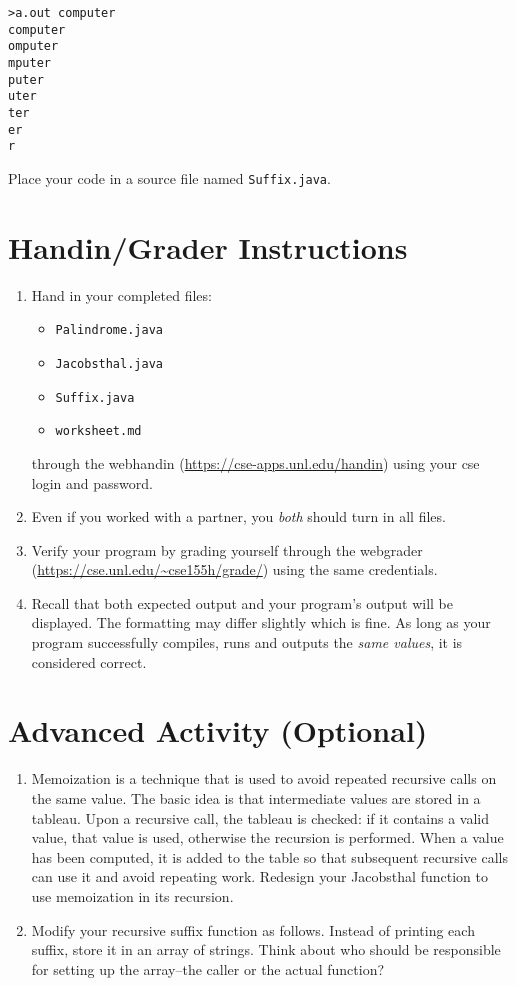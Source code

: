 \documentclass[12pt]{scrartcl}
\begin{document}
\begin{verbatim}
>a.out computer
computer
omputer
mputer
puter
uter
ter
er
r
\end{verbatim}

Place your code in a source file named 
\texttt{Suffix.java}.

\section{Handin/Grader Instructions}

\begin{enumerate}
  \item Hand in your completed files:
    \begin{itemize}
    \item \texttt{Palindrome.java}
    \item \texttt{Jacobsthal.java}
    \item \texttt{Suffix.java}
    \item \texttt{worksheet.md}
  \end{itemize}
  through the webhandin (\url{https://cse-apps.unl.edu/handin}) 
  using your cse login and password.  
  \item Even if you worked with a partner, you \emph{both} should
  turn in all files.
  \item Verify your program by grading yourself through the
  webgrader (\url{https://cse.unl.edu/~cse155h/grade/}) using the
  same credentials.
  \item Recall that both expected output and your program's output
  will be displayed.  The formatting may differ slightly which is fine.
  As long as your program successfully compiles, runs and outputs 
  the \emph{same values}, it is considered correct.
\end{enumerate}


\section{Advanced Activity (Optional)}

\begin{enumerate}
  \item Memoization is a technique that is used to avoid repeated 
  	recursive calls on the same value.  The basic idea is that intermediate 
	values are stored in a tableau.  Upon a recursive call, the tableau is 
	checked: if it contains a valid value, that value is used, otherwise the 
	recursion is performed.  When a value has been computed, it is added 
	to the table so that subsequent recursive calls can use it and avoid 
	repeating work.  Redesign your Jacobsthal function to use memoization 
	in its recursion.
  \item Modify your recursive suffix function as follows.  Instead of printing 
	each suffix, store it in an array of strings.  Think about who should be 
	responsible for setting up the array--the caller or the actual function? 
\end{enumerate}
	
\end{document}
